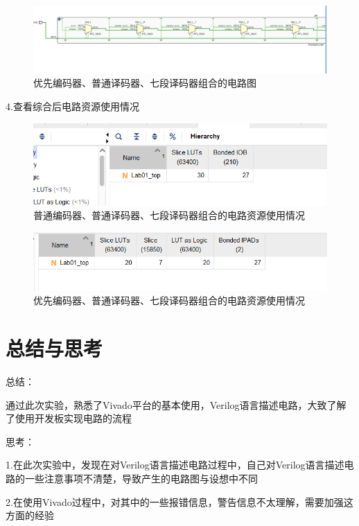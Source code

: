 \documentclass[UTF8,fontset=fandol]{ctexart}
\begin{document}
\begin{figure}[H]
    \centering
    \includegraphics[scale=0.6]{Snipaste_2021-11-03_20-02-44.png}
    \caption{优先编码器、普通译码器、七段译码器组合的电路图}
\end{figure}


4.查看综合后电路资源使用情况

\begin{figure}[H]
    \centering
    \includegraphics[scale=0.8]{Snipaste_2021-11-03_19-26-07.png}
    \caption{普通编码器、普通译码器、七段译码器组合的电路资源使用情况}
\end{figure}

\begin{figure}[H]
    \centering
    \includegraphics[scale=0.8]{Snipaste_2021-11-03_20-03-15.png}
    \caption{优先编码器、普通译码器、七段译码器组合的电路资源使用情况}
\end{figure}


\section*{总结与思考}
总结：

通过此次实验，熟悉了Vivado平台的基本使用，Verilog语言描述电路，大致了解了使用开发板实现电路的流程

思考：

1.在此次实验中，发现在对Verilog语言描述电路过程中，自己对Verilog语言描述电路的一些注意事项不清楚，导致产生的电路图与设想中不同

2.在使用Vivado过程中，对其中的一些报错信息，警告信息不太理解，需要加强这方面的经验
\end{document}
